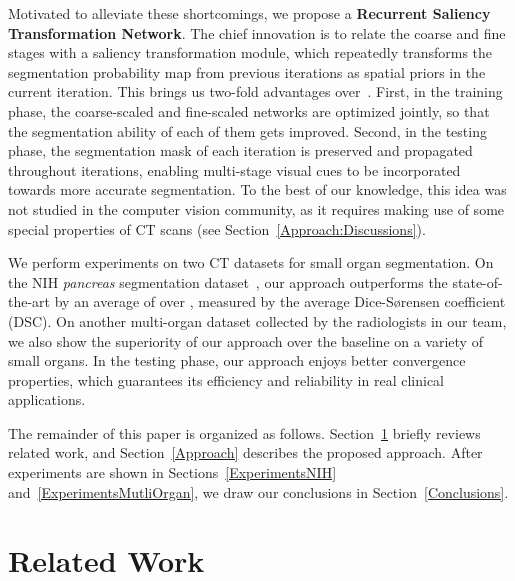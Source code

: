 \documentclass[10pt,twocolumn,letterpaper]{article}
\begin{document}
Motivated to alleviate these shortcomings, we propose a {\bf Recurrent Saliency Transformation Network}.
The chief innovation is to relate the coarse and fine stages with a saliency transformation module,
which repeatedly transforms the segmentation probability map from previous iterations as spatial priors in the current iteration.
This brings us two-fold advantages over~\cite{Zhou_2017_Fixed}.
First, in the training phase, the coarse-scaled and fine-scaled networks are optimized jointly,
so that the segmentation ability of each of them gets improved.
Second, in the testing phase, the segmentation mask of each iteration is preserved and propagated throughout iterations,
enabling multi-stage visual cues to be incorporated towards more accurate segmentation.
To the best of our knowledge, this idea was not studied in the computer vision community,
as it requires making use of some special properties of CT scans (see Section~\ref{Approach:Discussions}).

We perform experiments on two CT datasets for small organ segmentation.
On the NIH {\em pancreas} segmentation dataset~\cite{Roth_2015_DeepOrgan},
our approach outperforms the state-of-the-art by an average of over ,
measured by the average Dice-S{\o}rensen coefficient (DSC).
On another multi-organ dataset collected by the radiologists in our team,
we also show the superiority of our approach over the baseline on a variety of small organs.
In the testing phase, our approach enjoys better convergence properties,
which guarantees its efficiency and reliability in real clinical applications.

The remainder of this paper is organized as follows.
Section~\ref{RelatedWork} briefly reviews related work, and Section~\ref{Approach} describes the proposed approach.
After experiments are shown in Sections~\ref{ExperimentsNIH} and~\ref{ExperimentsMutliOrgan},
we draw our conclusions in Section~\ref{Conclusions}.


\section{Related Work}
\label{RelatedWork}
\end{document}
